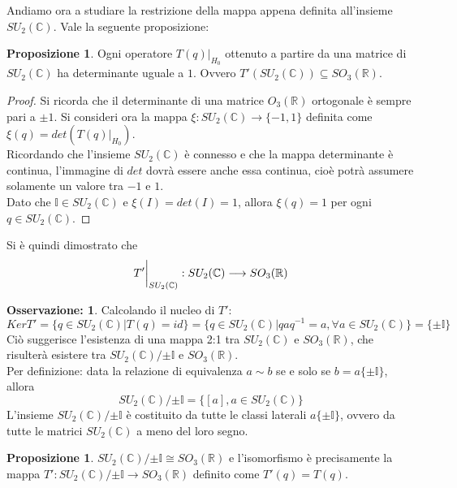 \documentclass[12pt,a4paper]{report}
\theoremstyle{definition}
\theoremstyle{Theorem}
\newtheorem{Prop}[Def]{Proposizione}
\theoremstyle{definition}
\theoremstyle{definition}
\theoremstyle{definition}
\newtheorem{Obs}[Def]{Osservazione:}
\begin{document}
Andiamo ora a studiare la restrizione della mappa appena definita all'insieme $SU_2(\mathbb{C})$. Vale la seguente proposizione:
\begin{Prop}
	Ogni operatore $T(q)|_{H_0}$ ottenuto a partire da una matrice di $SU_2(\mathbb{C})$ ha determinante uguale a $1$. Ovvero $T'(SU_2(\mathbb{C}))\subseteq SO_3(\mathbb{R})$. 
\end{Prop}
\begin{proof}
	Si ricorda che il determinante di una matrice $O_3(\mathbb{R})$ ortogonale è sempre pari a $\pm 1$.
	Si consideri ora la mappa $\xi:SU_2(\mathbb{C})\longrightarrow \{-1,1\}$ definita come $\xi(q)=det(T(q)|_{H_0})$.\\
	Ricordando che l'insieme $SU_2(\mathbb{C})$ è connesso e che la mappa determinante è continua, l'immagine di $det$ dovrà essere anche essa continua, cioè potrà assumere solamente un valore tra $-1$ e $1$.\\
	Dato che $\mathbb{I}\in SU_2(\mathbb{C})$ e $\xi(I)=det(I)=1$, allora $\xi(q)=1$ per ogni $q\in SU_2(\mathbb{C})$.
\end{proof}
Si è quindi dimostrato che 
$$T'\bigg{\rvert}_{SU_2(\mathbb{C})}:SU_2(\mathbb{C})\longrightarrow SO_3(\mathbb{R})$$
\begin{Obs} \label{Obs:3.2.3.1}
	Calcolando il nucleo di $T'$:$$KerT'=\{q\in SU_2(\mathbb{C})| T(q)=id\}=\{q\in SU_2(\mathbb{C})|qaq^{-1}=a, \forall a\in SU_2(\mathbb{C})\}=\{\pm\mathbb{I}\}$$
	Ciò suggerisce l'esistenza di una mappa 2:1 tra $SU_2(\mathbb{C})$ e $SO_3(\mathbb{R})$, che risulterà esistere tra $SU_2(\mathbb{C})/{\pm \mathbb{I}}$ e $SO_3(\mathbb{R})$.\\
	Per definizione: data la relazione di equivalenza $a\sim b$ se e solo se $b=a\{\pm \mathbb{I}\}$, allora
	$$SU_2(\mathbb{C})/{\pm \mathbb{I}}=\{[a], a\in SU_2(\mathbb{C})\}$$
	L'insieme $SU_2(\mathbb{C})/{\pm \mathbb{I}}$ è costituito da tutte le classi laterali $a\{\pm\mathbb{I}\}$, ovvero da tutte le matrici $SU_2(\mathbb{C})$ a meno del loro segno.
\end{Obs}
\begin{Prop}
	$SU_2(\mathbb{C})/{\pm \mathbb{I}}\cong SO_3(\mathbb{R})$ e l'isomorfismo è precisamente la mappa $T':SU_2(\mathbb{C})/{\pm \mathbb{I}}\longrightarrow SO_3(\mathbb{R})$ definito come $T'(q)=T(q)$.
\end{Prop}
\end{document}
